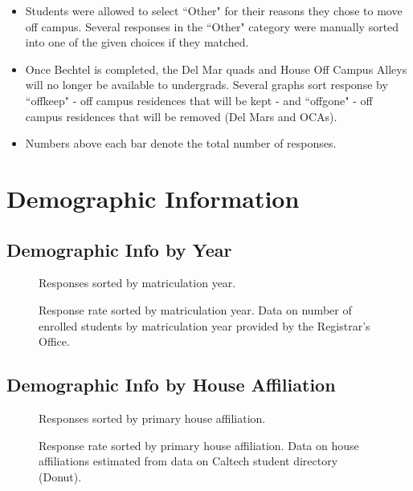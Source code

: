 \documentclass[12pt]{article} %
\begin{document}
\begin{itemize}
\item Students were allowed to select ``Other" for their reasons they chose to move off campus. Several responses in the ``Other" category were manually sorted into one of the given choices if they matched.
\item Once Bechtel is completed, the Del Mar quads and House Off Campus Alleys will no longer be available to undergrads. Several graphs sort response by ``offkeep" - off campus residences that will be kept - and ``offgone" - off campus residences that will be removed (Del Mars and OCAs).
\item Numbers above each bar denote the total number of responses.
\end{itemize}

\newpage
\section{Demographic Information}
\subsection{Demographic Info by Year}

\begin{figure}[H]
	\caption{Responses sorted by matriculation year.}
\end{figure}

\begin{figure}[H]
	\caption{Response rate sorted by matriculation year. Data on number of enrolled students by matriculation year 		provided by the Registrar's Office.}
\end{figure}
\subsection{Demographic Info by House Affiliation}

\begin{figure}[H]
	\caption{Responses sorted by primary house affiliation.}
\end{figure}

\begin{figure}[H]
	\caption{Response rate sorted by primary house affiliation. Data on house affiliations estimated from data on
	Caltech student directory (Donut).}
\end{figure}
\end{document}
